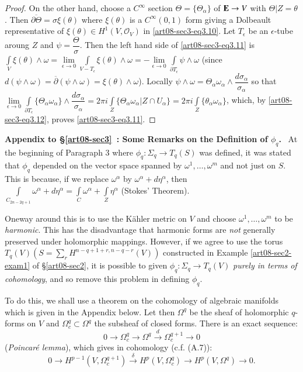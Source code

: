 \begin{proof}
On the other hand, choose a $C^{\infty}$ section $\Theta=\{\Theta_{\alpha}\}$ of $\mathbf{E}\to V$ with $\Theta|Z=\theta$. Then $\overline{\partial \Theta}=\sigma\xi(\theta)$ where $\xi(\theta)$ is a $C^{\infty}(0,1)$ form giving a Dolbeault representative of $\xi(\theta)\in H^{1}(V,\mathscr{O}_{V})$ in \eqref{art08-sec3-eq3.10}. Let $T_{\epsilon}$ be an $\epsilon$-tube aroung $Z$ and $\psi=\dfrac{\Theta}{\sigma}$. Then the left hand side of \eqref{art08-sec3-eq3.11} is $\int\limits_{V}\xi(\theta)\wedge \omega=\lim\limits_{\epsilon\to 0}\int\limits_{V-T_{\epsilon}}\xi(\theta)\wedge \omega=-\lim\limits_{\epsilon\to 0}\int\limits_{\partial T_{\epsilon}}\psi \wedge \omega$ (since $d(\psi\wedge \omega)= \overline{\partial}(\psi\wedge \omega)=\xi(\theta)\wedge \omega$). Locally $\psi\wedge \omega=\Theta_{\alpha}\omega_{\alpha}\wedge \dfrac{d\sigma_{\alpha}}{\sigma_{\alpha}}$ so that $\lim\limits_{\epsilon\to 0}\int\limits_{\partial T_{\epsilon}}\{\Theta_{\alpha}\omega_{\alpha}\}\wedge \dfrac{d\sigma_{\alpha}}{\sigma_{\alpha}}=2\pi i \int\limits_{Z}\{\Theta_{\alpha}\omega_{\alpha}|Z\cap U_{\alpha}\}=2\pi i\int\limits_{Z}\{\theta_{\alpha}\omega_{\alpha}\}$, which, by \eqref{art08-sec3-eq3.12}, proves \eqref{art08-sec3-eq3.11}.
\end{proof}

\medskip
\noindent
{\bf Appendix to \S\ref{art08-sec3}~: Some Remarks on the Definition of {\boldmath$\phi_{q}$}.}~ At the beginning of Paragraph 3 where $\phi_{q}:\Sigma_{q}\to T_{q}(S)$ was defined, it was stated that $\phi_{q}$ depended on the vector space spanned by $\omega^{1},\ldots,\omega^{m}$ and not just on $S$. This is because, if we replace $\omega^{\alpha}$ by $\omega^{\alpha}+d\eta^{\alpha}$, then $\int\limits_{C_{2n-2q+1}}\omega^{\alpha}+d\eta^{\alpha}=\int\limits_{C}\omega^{\alpha}+\int\limits_{Z}\eta^{\alpha}$ (Stokes' Theorem).

One\pageoriginale way around this is to use the K\"ahler metric on $V$ and choose $\omega^{1},\ldots,\omega^{m}$ to be {\em harmonic}. This has the disadvantage that harmonic forms are {\em not} generally preserved under holomorphic mappings. However, if we agree to use the torus $T_{q}(V)(S=\sum\limits_{r}H^{n-q+1+r,n-q-r}(V))$ constructed in Example \ref{art08-sec2-exam1} of \S\ref{art08-sec2}, it is possible to given $\phi_{q}:\Sigma_{q}\to T_{q}(V)$ {\em purely in terms of cohomology}, and so remove this problem in defining $\phi_{q}$.

To do this, we shall use a theorem on the cohomology of algebraic manifolds which is given in the Appendix below. Let then $\Omega^{q}$ be the sheaf of holomorphic $q$-forms on $V$ and $\Omega^{q}_{c}\subset \Omega^{q}$ the subsheaf of closed forms. There is an exact sequence:
\begin{equation*}
0\to \Omega^{q}_{c}\to \Omega^{q}\xrightarrow{d}\Omega^{q+1}_{c}\to 0\tag{A3.1}\label{art08-sec3-eqA3.1}
\end{equation*}
({\em Poincar\'e lemma}), which gives in cohomology (c.f. (A.7)):
\begin{equation*}
0\to H^{p-1}(V,\Omega^{q+1}_{c})\xrightarrow{\delta}H^{p}(V,\Omega^{q}_{c})\to H^{p}(V,\Omega^{q})\to 0.\tag{A3.2}\label{art08-sec3-eqA3.2}
\end{equation*}

